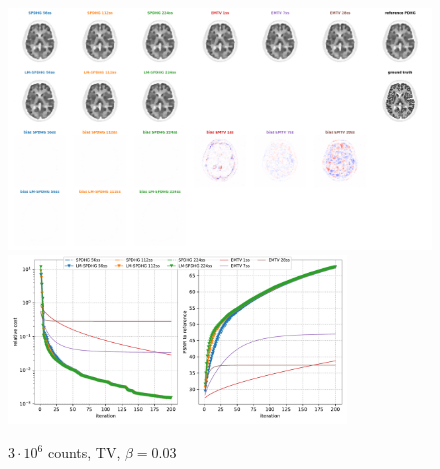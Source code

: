 \begin{figure}
  \centering
    \includegraphics[width=1.0\textwidth]{./figs/brain2d_counts_3.0E+06_seed_1_beta_3.0E-02_prior_TV_niter_ref_20000_fwhm_4.5_4.5_niter_200.png}
    \includegraphics[width=0.8\textwidth]{./figs/brain2d_counts_3.0E+06_seed_1_beta_3.0E-02_prior_TV_niter_ref_20000_fwhm_4.5_4.5_niter_200_metrics.pdf}
  \caption{$3\cdot10^6$ counts, TV, $\beta = 0.03$}
\end{figure}

